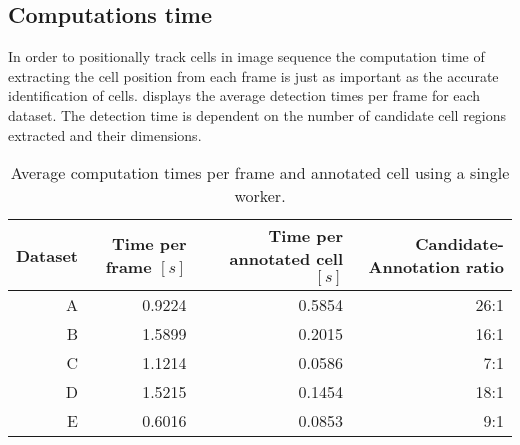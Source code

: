 
	\subsection{Computations time \statusnew}
	
		In order to positionally track cells in image sequence the computation time of extracting the cell position from each frame is just as important as the accurate identification of cells.  displays the average detection times per frame for each dataset. The detection time is dependent on the number of candidate cell regions extracted and their dimensions.
		
		
		
		
		
		\begin{table}[h]
			\centering
			\begin{tabular}{rrrr}
				Dataset & Time per frame  $\left[ s \right]$ & Time per annotated cell  $\left[ s \right]$ & Candidate-Annotation ratio \\
			\hline
				      A &                             0.9224 &                                      0.5854 &                       26:1 \\
				      B &                             1.5899 &                                      0.2015 &                       16:1 \\
				      C &                             1.1214 &                                      0.0586 &                        7:1 \\
				      D &                             1.5215 &                                      0.1454 &                       18:1 \\
				      E &                             0.6016 &                                      0.0853 &                        9:1
			\end{tabular} 
			\caption{Average computation times per frame and annotated cell using a single worker.}
			\label{tab:results_detector_speed}
		\end{table}
		
